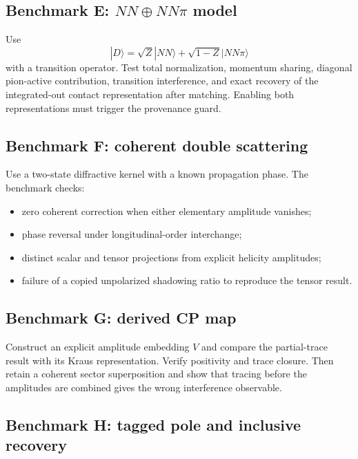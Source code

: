 \documentclass[11pt]{article}
\begin{document}
\subsection{Benchmark E: \texorpdfstring{\(NN\oplus NN\pi\)}{NN plus NNpi} model}

Use
\begin{equation}
 |D\rangle=\sqrt{Z}|NN\rangle+\sqrt{1-Z}|NN\pi\rangle
\label{eq:benchmark-two-sector-state}
\end{equation}
with a transition operator.  Test total normalization, momentum sharing,
diagonal pion-active contribution, transition interference, and exact
recovery of the integrated-out contact representation after matching.
Enabling both representations must trigger the provenance guard.

\subsection{Benchmark F: coherent double scattering}

Use a two-state diffractive kernel with a known propagation phase.  The
benchmark checks:
\begin{itemize}
\item zero coherent correction when either elementary amplitude vanishes;
\item phase reversal under longitudinal-order interchange;
\item distinct scalar and tensor projections from explicit helicity
      amplitudes;
\item failure of a copied unpolarized shadowing ratio to reproduce the tensor
      result.
\end{itemize}

\subsection{Benchmark G: derived CP map}

Construct an explicit amplitude embedding \(V\) and compare the partial-trace
result with its Kraus representation.  Verify positivity and trace closure.
Then retain a coherent sector superposition and show that tracing before the
amplitudes are combined gives the wrong interference observable.

\subsection{Benchmark H: tagged pole and inclusive recovery}
\end{document}
